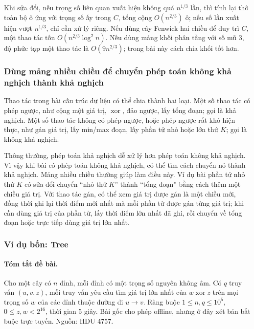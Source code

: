 \documentclass[11pt]{article}
\begin{document}
Khi sửa đổi, nếu trọng số liên quan xuất hiện không quá \(n^{1/3}\) lần, thì
tính lại thô toàn bộ ô ứng với trọng số ấy trong \(C\), tổng cộng
\(O(n^{2/3})\) ô; nếu số lần xuất hiện vượt \(n^{1/3}\), chỉ cần xử lý riêng.
Nếu dùng cây Fenwick hai chiều để duy trì \(C\), một thao tác tốn
\(O(n^{2/3}\log^2 n)\). Nếu dùng mảng khối phân tầng với số mũ \(3\), độ phức
tạp một thao tác là \(O(9n^{2/3})\); trong bài này cách chia khối tốt hơn.

\subsubsection{Dùng mảng nhiều chiều để chuyển phép toán không khả nghịch thành khả nghịch}

Thao tác trong bài cấu trúc dữ liệu có thể chia thành hai loại. Một số thao
tác có phép ngược, như cộng một giá trị, \(\operatorname{xor}\), đảo ngược,
lấy tổng đoạn; gọi là khả nghịch. Một số thao tác không có phép ngược, hoặc
phép ngược rất khó hiện thực, như gán giá trị, lấy min/max đoạn, lấy phần tử
nhỏ hoặc lớn thứ \(K\); gọi là không khả nghịch.

Thông thường, phép toán khả nghịch dễ xử lý hơn phép toán không khả nghịch. Vì
vậy khi bài có phép toán không khả nghịch, có thể tìm cách chuyển nó thành khả
nghịch. Mảng nhiều chiều thường giúp làm điều này. Ví dụ bài phần tử nhỏ thứ
\(K\) có sửa đổi chuyển ``nhỏ thứ \(K\)'' thành ``tổng đoạn'' bằng cách thêm
một chiều giá trị. Với thao tác gán, có thể xem giá trị được gán là một chiều
mới, đồng thời ghi lại thời điểm mới nhất mà mỗi phần tử được gán từng giá
trị; khi cần dùng giá trị của phần tử, lấy thời điểm lớn nhất đã ghi, rồi
chuyển về tổng đoạn hoặc trực tiếp dùng giá trị lớn nhất.

\subsubsection{Ví dụ bốn: Tree}

\paragraph{Tóm tắt đề bài.}
Cho một cây có \(n\) đỉnh, mỗi đỉnh có một trọng số nguyên không âm. Có \(q\)
truy vấn \((u,v,z)\), mỗi truy vấn yêu cầu tìm giá trị lớn nhất của
\(w\operatorname{xor} z\) trên mọi trọng số \(w\) của các đỉnh thuộc đường đi
\(u\to v\). Ràng buộc \(1\le n,q\le10^5\), \(0\le z,w<2^{16}\), thời gian
5 giây. Bài gốc cho phép offline, nhưng ở đây xét bản bắt buộc trực tuyến.
Nguồn: HDU 4757.
\end{document}
